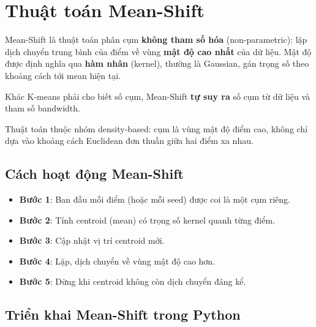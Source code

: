 \section{Thuật toán Mean-Shift}
\label{sec:mean-shift}

\begin{dinhnghia}[title={Mean-Shift Clustering}]
Mean-Shift là thuật toán phân cụm \textbf{không tham số hóa} (non-parametric): lặp dịch chuyển trung bình của điểm về vùng \textbf{mật độ cao nhất} của dữ liệu. Mật độ được định nghĩa qua \textbf{hàm nhân} (kernel), thường là Gaussian, gán trọng số theo khoảng cách tới mean hiện tại.
\end{dinhnghia}

\begin{ynghia}[title={Không cần chỉ định $K$ trước}]
Khác K-means phải cho biết số cụm, Mean-Shift \textbf{tự suy ra} số cụm từ dữ liệu và tham số bandwidth.
\end{ynghia}

\begin{tinhchat}[title={Phân cụm theo mật độ}]
Thuật toán thuộc nhóm density-based: cụm là vùng mật độ điểm cao, không chỉ dựa vào khoảng cách Euclidean đơn thuần giữa hai điểm xa nhau.
\end{tinhchat}

\subsection{Cách hoạt động Mean-Shift}

\begin{phuongphap}[title={Các bước}]
\begin{itemize}
  \item \textbf{Bước 1}: Ban đầu mỗi điểm (hoặc mỗi seed) được coi là một cụm riêng.
  \item \textbf{Bước 2}: Tính centroid (mean) có trọng số kernel quanh từng điểm.
  \item \textbf{Bước 3}: Cập nhật vị trí centroid mới.
  \item \textbf{Bước 4}: Lặp, dịch chuyển về vùng mật độ cao hơn.
  \item \textbf{Bước 5}: Dừng khi centroid không còn dịch chuyển đáng kể.
\end{itemize}
\end{phuongphap}

\subsection{Triển khai Mean-Shift trong Python}

